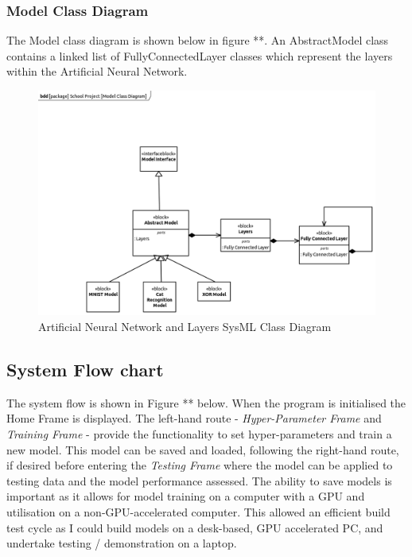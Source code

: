 \documentclass[./project-report/src/latex/project-report.tex]{subfiles}
\begin{document}
\subsubsection{Model Class Diagram}

The  Model class diagram is shown below in figure **. An AbstractModel class contains a linked list of FullyConnectedLayer classes which represent the layers within the 
Artificial Neural Network.

\begin{figure}[h!]
\centering
\includegraphics[width=1\textwidth]{./project-report/src/images/model-class-diagram.png}
\caption{Artificial Neural Network and Layers SysML Class Diagram}
\label{fig:model-class-diagram}
\end{figure}

\pagebreak

\subsection{System Flow chart}

The system flow is shown in Figure ** below. When the program is initialised the Home Frame is displayed. The left-hand route - \textit{Hyper-Parameter Frame} and 
\textit{Training Frame} - provide the functionality to set hyper-parameters and train a new model. This model can be saved and loaded, following the right-hand route, 
if desired before entering the \textit{Testing Frame} where the model can be applied to testing data and the model performance assessed. The ability to save models is 
important as it allows for model training on a computer with a GPU and utilisation on a non-GPU-accelerated computer. This allowed an efficient build test cycle as I could 
build models on a desk-based, GPU accelerated PC, and undertake testing / demonstration on a laptop.
\end{document}
